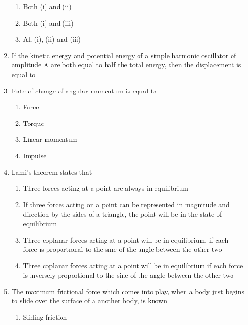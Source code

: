 \documentclass[11pt,a4paper]{article}
\begin{document}
\begin{enumerate}
\begin{enumerate}[label=\Alph*.]
\item{Both (i) and (ii)}
\item{Both (i) and (iii)}
\item{All (i), (ii) and (iii)}
\end{enumerate}
\item{If the kinetic energy and potential energy of a simple harmonic oscillator of amplitude A are both equal to half the total energy, then the displacement is equal to}
\\
\item{Rate of change of angular momentum is equal to}
\begin{enumerate}[label=\Alph*.]
\item{Force}
\item{Torque}
\item{Linear momentum}
\item{Impulse}
\end{enumerate}
\item{Lami's theorem states that}
\begin{enumerate}[label=\Alph*.]
\item{Three forces acting at a point are always in equilibrium}
\item{If three forces acting on a point can be represented in magnitude and direction by the sides of a triangle, the point will be in the state of equilibrium}
\item{Three coplanar forces acting at a point will be in equilibrium, if each force is proportional to the sine of the angle between the other two}
\item{Three coplanar forces acting at a point will be in equilibrium if each force is inversely proportional to the sine of the angle between the other two}
\end{enumerate}
\item{The maximum frictional force which comes into play, when a body just begins to slide over the surface of a another body, is known}
\begin{enumerate}[label=\Alph*.]
\item{Sliding friction}

\end{enumerate}
\end{enumerate}
\end{document}
